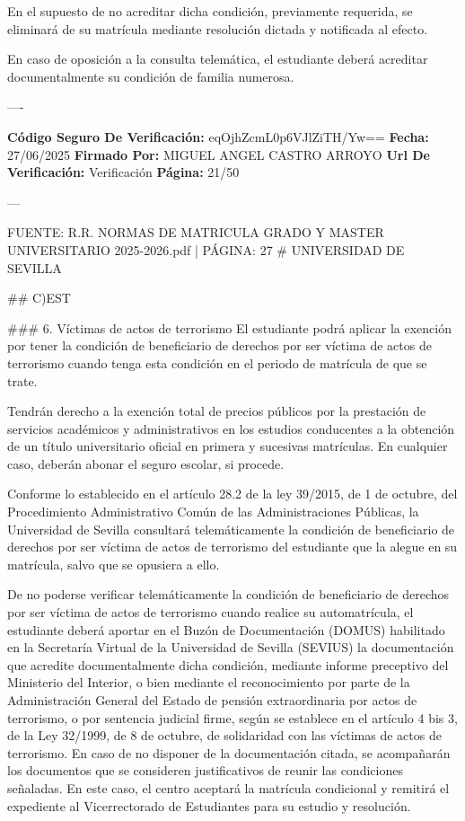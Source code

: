 \documentclass{article}
\begin{document}
\begin{itemize}
\begin{itemize}
\begin{scriptsize}
                  En el supuesto de no acreditar dicha condición, previamente requerida, se eliminará de su matrícula mediante resolución dictada y notificada al efecto.

                  En caso de oposición a la consulta telemática, el estudiante deberá acreditar documentalmente su condición de familia numerosa.

                  ----

                  \textbf{Código Seguro De Verificación:} eqOjhZcmL0p6VJlZiTH/Yw==
                  \textbf{Fecha:} 27/06/2025
                  \textbf{Firmado Por:} MIGUEL ANGEL CASTRO ARROYO
                  \textbf{Url De Verificación:} Verificación
                  \textbf{Página:} 21/50

                  ---

                  FUENTE: R.R. NORMAS DE MATRICULA GRADO Y MASTER UNIVERSITARIO 2025-2026.pdf | PÁGINA: 27
                  \# UNIVERSIDAD DE SEVILLA

                  \#\# C)EST

                  \#\#\# 6. Víctimas de actos de terrorismo
                  El estudiante podrá aplicar la exención por tener la condición de beneficiario de derechos por ser víctima de actos de terrorismo cuando tenga esta condición en el periodo de matrícula de que se trate.

                  Tendrán derecho a la exención total de precios públicos por la prestación de servicios académicos y administrativos en los estudios conducentes a la obtención de un título universitario oficial en primera y sucesivas matrículas. En cualquier caso, deberán abonar el seguro escolar, si procede.

                  Conforme lo establecido en el artículo 28.2 de la ley 39/2015, de 1 de octubre, del Procedimiento Administrativo Común de las Administraciones Públicas, la Universidad de Sevilla consultará telemáticamente la condición de beneficiario de derechos por ser víctima de actos de terrorismo del estudiante que la alegue en su matrícula, salvo que se opusiera a ello.

                  De no poderse verificar telemáticamente la condición de beneficiario de derechos por ser víctima de actos de terrorismo cuando realice su automatrícula, el estudiante deberá aportar en el Buzón de Documentación (DOMUS) habilitado en la Secretaría Virtual de la Universidad de Sevilla (SEVIUS) la documentación que acredite documentalmente dicha condición, mediante informe preceptivo del Ministerio del Interior, o bien mediante el reconocimiento por parte de la Administración General del Estado de pensión extraordinaria por actos de terrorismo, o por sentencia judicial firme, según se establece en el artículo 4 bis 3, de la Ley 32/1999, de 8 de octubre, de solidaridad con las víctimas de actos de terrorismo. En caso de no disponer de la documentación citada, se acompañarán los documentos que se consideren justificativos de reunir las condiciones señaladas. En este caso, el centro aceptará la matrícula condicional y remitirá el expediente al Vicerrectorado de Estudiantes para su estudio y resolución.


\end{scriptsize}
\end{itemize}
\end{itemize}
\end{document}
